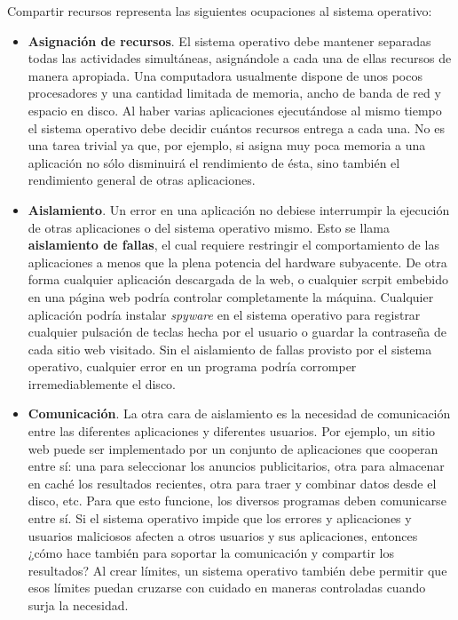 \documentclass[10pt]{book}
\begin{document}
Compartir recursos representa las siguientes ocupaciones al sistema operativo:
\begin{itemize}
\item \textbf{Asignación de recursos}. El sistema operativo debe mantener separadas todas las actividades simultáneas, asignándole a cada una de ellas recursos de manera apropiada. Una computadora usualmente dispone de unos pocos procesadores y una cantidad limitada de memoria, ancho de banda de red y espacio en disco. Al haber varias aplicaciones ejecutándose al mismo tiempo el sistema operativo debe decidir cuántos recursos entrega a cada una. No es una tarea trivial ya que, por ejemplo, si asigna muy poca memoria a una aplicación no sólo disminuirá el rendimiento de ésta, sino también el rendimiento general de otras aplicaciones.

\item \textbf{Aislamiento}. Un error en una aplicación no debiese interrumpir la ejecución de otras aplicaciones o del sistema operativo mismo. Esto se llama \textbf{aislamiento de fallas}, el cual requiere restringir el comportamiento de las aplicaciones a menos que la plena potencia del hardware subyacente. De otra forma cualquier aplicación descargada de la web, o cualquier scrpit embebido en una página web podría controlar completamente la máquina. Cualquier aplicación podría instalar \textit{spyware} en el sistema operativo para registrar cualquier pulsación de teclas hecha por el usuario o guardar la contraseña de cada sitio web visitado. Sin el aislamiento de fallas provisto por el sistema operativo, cualquier error en un programa podría corromper irremediablemente el disco.

\item \textbf{Comunicación}. La otra cara de aislamiento es la necesidad de comunicación entre las diferentes aplicaciones y diferentes usuarios. Por ejemplo, un sitio web puede ser implementado por un conjunto de aplicaciones que cooperan entre sí: una para seleccionar los anuncios publicitarios, otra para almacenar en caché los resultados recientes, otra para traer y combinar datos desde el disco, etc. Para que esto funcione, los diversos programas deben comunicarse entre sí. Si el sistema operativo impide que los errores y aplicaciones y usuarios maliciosos afecten a otros usuarios y sus aplicaciones, entonces ¿cómo hace también para soportar la comunicación y compartir los resultados? Al crear límites, un sistema operativo también debe permitir que esos límites puedan cruzarse con cuidado en maneras controladas cuando surja la necesidad.
\end{itemize}
\end{document}
